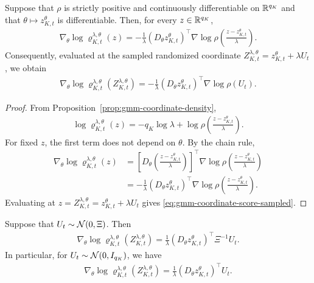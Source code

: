 \begin{proposition}
    \label{prop:gmm-coordinate-score}
    Suppose that $\rho$ is strictly positive and continuously differentiable on $\mathbb{R}^{q_K}$ and that $\theta\mapsto z_{K,t}^{\theta}$ is differentiable. Then, for every $z\in\mathbb{R}^{q_K}$,
    \begin{align}
        \label{eq:gmm-coordinate-score-general}
        \nabla_\theta\log\varrho_{K,t}^{\lambda,\theta}(z) = -\frac{1}{\lambda}\left(D_\theta z_{K,t}^\theta\right)^\top\nabla\log\rho\left(\frac{z-z_{K,t}^\theta}{\lambda}\right).
    \end{align}
    Consequently, evaluated at the sampled randomized coordinate $Z_{K,t}^{\lambda,\theta} = z_{K,t}^\theta + \lambda U_t$, we obtain
    \begin{align}
        \label{eq:gmm-coordinate-score-sampled-app}
        \nabla_\theta\log\varrho_{K,t}^{\lambda,\theta}\left(Z_{K,t}^{\lambda,\theta}\right) = -\frac{1}{\lambda}\left(D_\theta z_{K,t}^\theta\right)^\top\nabla\log\rho(U_t).
    \end{align}
\end{proposition}

\begin{proof}
From Proposition~\ref{prop:gmm-coordinate-density},
\begin{align}
    \log\varrho_{K,t}^{\lambda,\theta}(z) = -q_K\log\lambda + \log\rho\left(\frac{z-z_{K,t}^\theta}{\lambda}\right).
\end{align}
For fixed $z$, the first term does not depend on $\theta$. By the chain rule,
\begin{align}
    \nabla_\theta\log\varrho_{K,t}^{\lambda,\theta}(z)
    &= \left[D_\theta\left(\frac{z-z_{K,t}^{\theta}}{\lambda}\right)\right]^\top \nabla\log\rho\left(\frac{z-z_{K,t}^\theta}{\lambda}\right)\\
    &= -\frac{1}{\lambda}\left(D_\theta z_{K,t}^{\theta}\right)^\top \nabla\log\rho\left(\frac{z-z_{K,t}^\theta}{\lambda}\right).
\end{align}
Evaluating at $z=Z_{K,t}^{\lambda,\theta}=z_{K,t}^{\theta}+\lambda U_t$ gives \eqref{eq:gmm-coordinate-score-sampled}.
\end{proof}

\begin{corollary}
    \label{cor:gmm-gaussian-score}
    Suppose that $U_t\sim{\cal N}(0,\Xi)$. Then
    \begin{align}
        \label{eq:gmm-gaussian-score}
        \nabla_\theta\log\varrho_{K,t}^{\lambda,\theta}\left(Z_{K,t}^{\lambda,\theta}\right) = \frac1\lambda \left(D_\theta z_{K,t}^\theta\right)^\top \Xi^{-1}U_t.
    \end{align}
    In particular, for $U_t\sim{\cal N}(0,I_{q_K})$, we have
    \begin{align}
        \label{eq:gmm-isotropic-score}
        \nabla_\theta\log\varrho_{K,t}^{\lambda,\theta}\left(Z_{K,t}^{\lambda,\theta}\right) = \frac1\lambda\left(D_\theta z_{K,t}^\theta\right)^\top U_t.
    \end{align}
\end{corollary}


